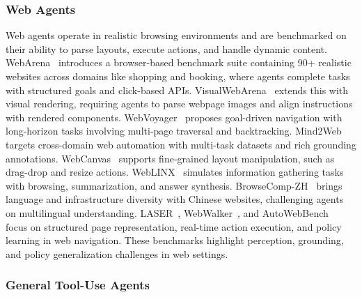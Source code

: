 \subsubsection{Web Agents}
Web agents operate in realistic browsing environments and are benchmarked on their ability to parse layouts, execute actions, and handle dynamic content. WebArena~\cite{shuyan2023webarena} introduces a browser-based benchmark suite containing 90+ realistic websites across domains like shopping and booking, where agents complete tasks with structured goals and click-based APIs. VisualWebArena~\cite{jing2024visualwebarena} extends this with visual rendering, requiring agents to parse webpage images and align instructions with rendered components. WebVoyager~\cite{he2024webvoyager} proposes goal-driven navigation with long-horizon tasks involving multi-page traversal and backtracking. Mind2Web~\cite{gou2025mind2web2} targets cross-domain web automation with multi-task datasets and rich grounding annotations. WebCanvas~\cite{yichen2024webcanvas} supports fine-grained layout manipulation, such as drag-drop and resize actions. WebLINX~\cite{xing2024weblinx} simulates information gathering tasks with browsing, summarization, and answer synthesis. BrowseComp-ZH~\cite{peilin2025browsecompzh} brings language and infrastructure diversity with Chinese websites, challenging agents on multilingual understanding. LASER~\cite{kaixin2023laser}, WebWalker~\cite{wu2025webwalker}, and AutoWebBench~\cite{lai2024autowebglm} focus on structured page representation, real-time action execution, and policy learning in web navigation. These benchmarks highlight perception, grounding, and policy generalization challenges in web settings.

\subsubsection{General Tool-Use Agents}

